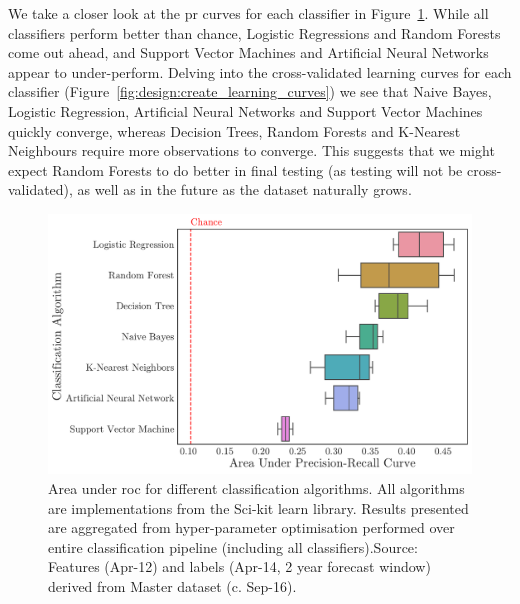 \documentclass[../thesis/thesis.tex]{subfiles}
\begin{document}
We take a closer look at the \gls{pr} curves for each classifier in Figure~\ref{fig:design:classifier}. While all classifiers perform better than chance, Logistic Regressions and Random Forests come out ahead, and Support Vector Machines and Artificial Neural Networks appear to under-perform. Delving into the cross-validated learning curves for each classifier (Figure~\ref{fig:design:create_learning_curves}) we see that Naive Bayes, Logistic Regression, Artificial Neural Networks and Support Vector Machines quickly converge, whereas Decision Trees, Random Forests and K-Nearest Neighbours require more observations to converge. This suggests that we might expect Random Forests to do better in final testing (as testing will not be cross-validated), as well as in the future as the dataset naturally grows.

\begin{figure}[!htb]
    \centering
    \includegraphics[width=\textwidth]{../figures/design/classifier}
    \caption[Area under PR Curves by classification algorithms]{Area under \gls{roc} for different classification algorithms. All algorithms are implementations from the Sci-kit learn library. Results presented are aggregated from hyper-parameter optimisation performed over entire classification pipeline (including all classifiers).Source: Features (Apr-12) and labels (Apr-14, 2 year forecast window) derived from Master dataset (c. Sep-16).}
    \label{fig:design:classifier}
\end{figure}
\end{document}
